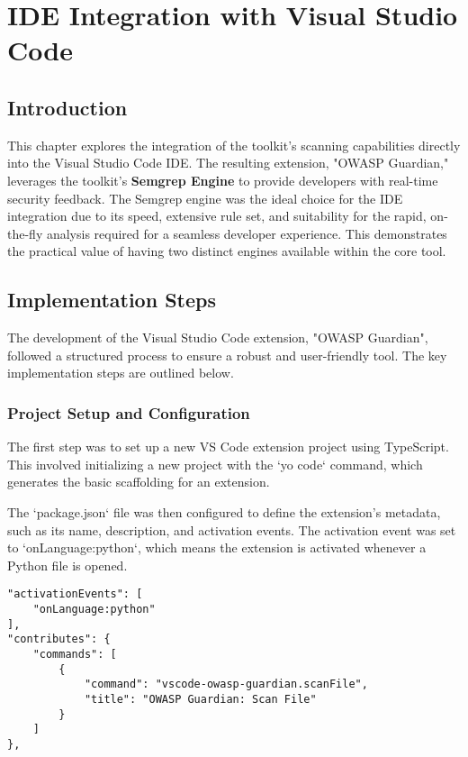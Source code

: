 \chapter{IDE Integration with Visual Studio Code}
\label{chap:ide}


\section{Introduction}

This chapter explores the integration of the toolkit's scanning capabilities directly into the Visual Studio Code IDE. The resulting extension, "OWASP Guardian," leverages the toolkit's \textbf{Semgrep Engine} to provide developers with real-time security feedback. The Semgrep engine was the ideal choice for the IDE integration due to its speed, extensive rule set, and suitability for the rapid, on-the-fly analysis required for a seamless developer experience. This demonstrates the practical value of having two distinct engines available within the core tool.

\section{Implementation Steps}

The development of the Visual Studio Code extension, "OWASP Guardian", followed a structured process to ensure a robust and user-friendly tool. The key implementation steps are outlined below.

\subsection{Project Setup and Configuration}

The first step was to set up a new VS Code extension project using TypeScript. This involved initializing a new project with the `yo code` command, which generates the basic scaffolding for an extension.

The `package.json` file was then configured to define the extension's metadata, such as its name, description, and activation events. The activation event was set to `onLanguage:python`, which means the extension is activated whenever a Python file is opened.

\begin{verbatim}
"activationEvents": [
    "onLanguage:python"
],
"contributes": {
    "commands": [
        {
            "command": "vscode-owasp-guardian.scanFile",
            "title": "OWASP Guardian: Scan File"
        }
    ]
},
\end{verbatim}

